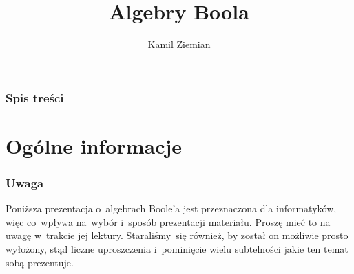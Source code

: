 \documentclass[10pt,t]{beamer}
\title{Algebry Boola}
\subtitle{}
\author{Kamil Ziemian}
\date{}
\begin{document}





\RaggedRight





\maketitle





\begin{frame}
  \frametitle{Spis treści}


  \tableofcontents

\end{frame}










\section{Ogólne informacje}



\begin{frame}
  \frametitle{Uwaga}


  Poniższa prezentacja o~algebrach Boole’a jest przeznaczona dla
  informatyków, więc co~wpływa na~wybór i~sposób prezentacji materiału.
  Proszę mieć to na uwagę w~trakcie jej lektury. Staraliśmy~się również,
  by został on możliwie prosto wyłożony, stąd liczne uproszczenia
  i~pominięcie wielu subtelności jakie ten temat sobą prezentuje.

\end{frame}
\end{document}
